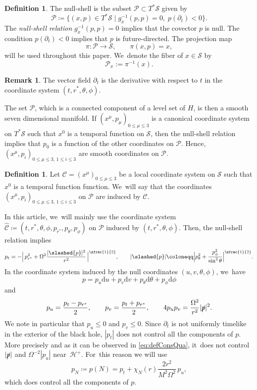 \documentclass[10pt]{amsart}
\theoremstyle{plain}
\theoremstyle{definition}
\newtheorem{definition}[proposition]{Definition}
\newtheorem{remark}[proposition]{Remark}
\renewcommand\H{{\mathcal{H}^+}}
\newcommand\dr{{\mathrm{d}}}
\begin{document}
\begin{definition}
The null-shell is the subset $\mathcal{P}\subset T^*\mathcal{S}$ given by
\[
\mathcal{P} \coloneqq \bigl\{(x,p)\in T^*\mathcal{S}\mid g^{-1}_x(p,p)=0, \; p(\partial_t) <0 \bigr\}.
\]
The \emph{null-shell relation} $g^{-1}_x(p,p)=0$ implies that the covector $p$ is null. The condition $p(\partial_t)<0$ implies that $p$ is future-directed. The projection map
\[
\pi \colon \mathcal{P} \to \mathcal{S},\qquad \pi (x,p)=x,
\]
will be used throughout this paper. We~denote the fiber of $x \in \mathcal{S}$ by
\[
\mathcal{P}_x := \pi^{-1}(x).
\]
\end{definition}
\begin{remark}
The vector field $\partial_t$ is the derivative with respect to $t$ in the coordinate system $(t,r^*,\theta, \phi)$.
\end{remark}

The set $\mathcal{P}$, which is a connected component of a level set of $H$, is then a smooth seven dimensional manifold. If $(x^\mu,p_\mu)_{0 \leq \mu \leq 3}$ is a canonical coordinate system on $T^* \mathcal{S}$ such that $x^0$ is a temporal function on $\mathcal{S}$, then the null-shell relation implies that $p_0$ is a function of the other coordinates on $\mathcal{P}$. Hence, $(x^\mu,p_i)_{0 \leq \mu \leq 3, \, 1 \leq i \leq 3}$ are smooth coordinates on $\mathcal{P}$.

\begin{definition}
Let $\mathscr{C}=(x^{\mu})_{0 \leq \mu \leq 3}$ be a local coordinate system on $\mathcal{S}$ such that $x^0$ is a temporal function function. We~will say that the coordinates $(x^\mu,p_i)_{0 \leq \mu \leq 3, \, 1 \leq i \leq 3}$ on $\mathcal{P}$ are induced by $\mathscr{C}$.
\end{definition}

In this article, we~will mainly use the coordinate system $\widehat{\mathscr{C}} \coloneqq (t,r^*,\theta, \phi, p_{r^*},p_\theta, p_\phi)$ on $\mathcal{P}$ induced by $(t,r^*,\theta, \phi)$. Then, the null-shell relation implies
\begin{equation}\label{eq:defConsQua}
p_t = - \Big| \,p_{r^*}^2 + \Omega^2 \frac{|\slashed{p}|^2}{r^2} \, \Big|^{\sfrac{1}{2}},\qquad |\slashed{p}| \coloneqq \Big|p_{\theta}^2+\frac{ p_{\phi}^2}{\sin^2 \theta }\Big|^{\sfrac{1}{2}}.
\end{equation}
In the coordinate system induced by the null coordinates $(u,v,\theta, \phi)$, we~have
\[
p= p_u \dr u +p_v \dr v +p_\theta \dr \theta + p_\phi \dr \phi
\]
and
\[
p_u = \frac{p_t-p_{r^*}}{2}, \qquad p_v = \frac{p_t+p_{r^*}}{2}, \qquad 4p_up_v = \frac{\Omega^2}{r^2}|\slashed{p}|^2.
\]
We note in particular that $p_u \leq 0$ and $p_v \leq 0$. Since $\partial_t$ is not uniformly timelike in the exterior of the black hole, $|p_t|$ does not control all the components of $p$. More precisely and as it can be observed in \eqref{eq:defConsQua}, it~does not control $|\slashed{p}|$ and $\Omega^{-2}|p_u|$ near~$\H$. For~this reason we will use
\begin{equation}\label{eq:defpN}
p_N\coloneqq p(N)= p_t+ \chi_N (r) \frac{2r^2}{M^2\Omega^2}\, p_u,
\end{equation}
which does control all the components of $p$.
\end{document}
